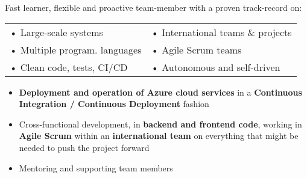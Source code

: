 \documentclass[10pt,a4paper]{altacv}
\begin{document}
\tagline{}

\begin{fullwidth}
\makecvheader
\end{fullwidth}


Fast learner, flexible and proactive team-member with a proven track-record on:

\smallskip

\begin{tabularx}{\linewidth}{X X}
	• Large-scale systems         & • International teams \& projects     \\
	• Multiple program. languages & • Agile Scrum teams          \\
	• Clean code, tests, CI/CD    & • Autonomous and self-driven
\end{tabularx}


\begin{itemize}
	\item \textbf{Deployment and operation of Azure cloud services} in a \textbf{Continuous Integration / Continuous Deployment} fashion
	\item Cross-functional development, in \textbf{backend and frontend code},  working in \textbf{Agile Scrum} within an \textbf{international team} on everything that might be needed to push the project forward
	\item Mentoring and supporting team members
\end{itemize}
\end{document}
